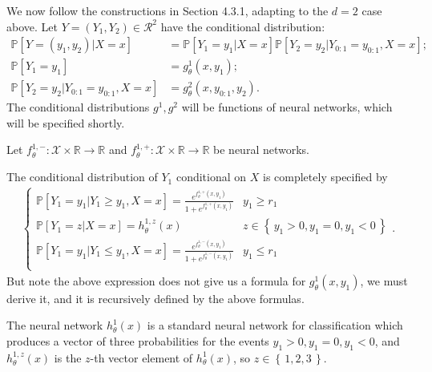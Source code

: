 \documentclass[12pt, reqno]{amsart}
\theoremstyle{definition}
\theoremstyle{definition}
\theoremstyle{plain}
\theoremstyle{definition}
\theoremstyle{remark}
\newcommand{\R}{\mathbb{R}}				%
\newcommand{\bee}{\begin{equation}\begin{aligned}}
\newcommand{\eee}{\end{aligned}\end{equation}}
\newcommand{\fracc}{\frac}				%
\renewcommand{\leq}{\leqslant}			%
\renewcommand{\geq}{\geqslant}			%
\renewcommand{\'}{\hspace{0.5mm}'}			%
\renewcommand{\Set}[1]{\left\{\,#1\,\right\}}	%
\begin{document}
We now follow the constructions in Section 4.3.1, adapting to the $d = 2$ case above. Let $Y = (Y_1, Y_2) \in \mathcal{R}^2$ have the conditional distribution:
\bee
	\mathbb{P}[Y = (y_1, y_2)|X = x] 
	&=
		\mathbb{P}[Y_1 = y_1|X = x]
		\mathbb{P}[Y_2 = y_2| Y_{0:1} = y_{0:1}, X = x];
		\\
	\mathbb{P}[Y_1 = y_1]
	&=
		g_\theta^1(x,y_1);
		\\
	\mathbb{P}[Y_2 = y_2|Y_{0:1} = y_{0:1}, X = x]
	&=
		g_\theta^2 (x, y_{0:1}, y_2). 
\eee
The conditional distributions $g^1, g^2$ will be functions of neural networks, which will be specified shortly. 

Let $f_\theta^{1,-}:\mathcal{X} \times \R \to \R$ and $f_\theta^{1, +}: \mathcal{X} \times \R \to \R$ be neural networks. 

The conditional distribution of $Y_1$ conditional on $X$ is completely specified by
\bee\label{y1conddist}
	\begin{cases}
		\mathbb{P}[Y_1 = y_1|Y_1 \geq y_1, X = x] 
		= \fracc{
			e^{f_\theta^{1,+}(x,y_1)}
		}{
			1 + e^{f_\theta^{1,+}(x,y_1)}
		} 
		& y_1 \geq r_1 \\
		\mathbb{P}[Y_1 = z|X = x] = h_\theta^{1,z}(x) 
		& z \in \Set{y_1 > 0, y_1 = 0, y_1 < 0} \\
		\mathbb{P}[Y_1 = y_1|Y_1 \leq y_1, X = x] 
		= \fracc{
			e^{f_\theta^{1,-}(x,y_1)}
		}{
			1 + e^{f_\theta^{1,-}(x,y_1)}
		} 
		& y_1 \leq r_1 \\
	\end{cases}.
\eee
But note the above expression does not give us a formula for $g_\theta^1(x,y_1)$, we must derive it, and it is recursively defined by the above formulas. 

The neural network $h_{\theta}^1(x)$ is a standard neural network for classification which produces a vector of three probabilities for the events $y_1 > 0, y_1 = 0, y_1 < 0$, and $h_\theta^{1,z}(x)$ is the $z$-th vector element of $h_\theta^1(x)$, so $z \in \Set{1,2,3}$. 

\end{document}
